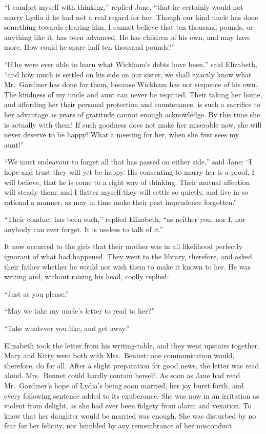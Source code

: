 \documentclass[12pt,english,oneside]{book}
\begin{document}
{}``I comfort myself with thinking,'' replied Jane, {}``that he
certainly would not marry Lydia if he had not a real regard for her.
Though our kind uncle has done something towards clearing him, I cannot
believe that ten thousand pounds, or anything like it, has been advanced.
He has children of his own, and may have more. How could he spare
half ten thousand pounds?''\ 

{}``If he were ever able to learn what Wickham's debts have been,''
said Elizabeth, {}``and how much is settled on his side on our sister,
we shall exactly know what Mr.\ Gardiner has done for them, because
Wickham has not sixpence of his own. The kindness of my uncle and
aunt can never be requited. Their taking her home, and affording her
their personal protection and countenance, is such a sacrifice to
her advantage as years of gratitude cannot enough acknowledge. By
this time she is actually with them! If such goodness does not make
her miserable now, she will never deserve to be happy! What a meeting
for her, when she first sees my aunt!''\ 

{}``We must endeavour to forget all that has passed on either side,''
said Jane: {}``I hope and trust they will yet be happy. His consenting
to marry her is a proof, I will believe, that he is come to a right
way of thinking. Their mutual affection will steady them; and I flatter
myself they will settle so quietly, and live in so rational a manner,
as may in time make their past imprudence forgotten.''

{}``Their conduct has been such,'' replied Elizabeth, {}``as neither
you, nor I, nor anybody can ever forget. It is useless to talk of
it.''

It now occurred to the girls that their mother was in all likelihood
perfectly ignorant of what had happened. They went to the library,
therefore, and asked their father whether he would not wish them to
make it known to her. He was writing and, without raising his head,
coolly replied:

{}``Just as you please.''

{}``May we take my uncle's letter to read to her?''\ 

{}``Take whatever you like, and get away.''

Elizabeth took the letter from his writing-table, and they went upstairs
together. Mary and Kitty were both with Mrs.\ Bennet: one communication
would, therefore, do for all. After a slight preparation for good
news, the letter was read aloud. Mrs.\ Bennet could hardly contain
herself. As soon as Jane had read Mr.\ Gardiner's hope of Lydia's
being soon married, her joy burst forth, and every following sentence
added to its exuberance. She was now in an irritation as violent from
delight, as she had ever been fidgety from alarm and vexation. To
know that her daughter would be married was enough. She was disturbed
by no fear for her felicity, nor humbled by any remembrance of her
misconduct.
\end{document}
